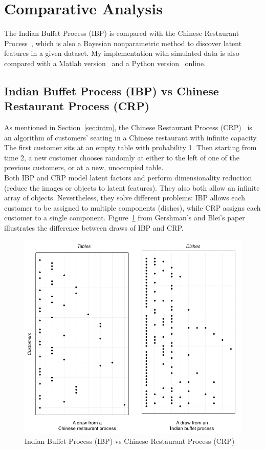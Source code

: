 \section{Comparative Analysis}

The Indian Buffet Process (IBP) is compared with the Chinese Restaurant Process~\cite{crp2004hierarchical}, which is also a Bayesian nonparametric method to discover latent features in a given dataset. My implementation with simulated data is also compared with a Matlab version~\cite{ibp2012code} and a Python version~\cite{ibpgithub} online.

\subsection{Indian Buffet Process (IBP) vs Chinese Restaurant Process (CRP)}

As mentioned in Section~\ref{sec:intro}, the Chinese Restaurant Process (CRP)~\cite{crp2004hierarchical} is an algorithm of customers' seating in a Chinese restaurant with infinite capacity. The first customer sits at an empty table with probability 1. Then starting from time 2, a new customer chooses randomly at either to the left of one of the previous customers, or at a new, unoccupied table.\\

Both IBP and CRP model latent factors and perform dimensionality reduction (reduce the images or objects to latent features). They also both allow an infinite array of objects. Nevertheless, they solve different problems: IBP allows each customer to be assigned to multiple components (dishes), while CRP assigns each customer to a single component. Figure~\ref{fig:CRP} from Gershman's and Blei's paper~\cite{gershman2012tutorial} illustrates the difference between draws of IBP and CRP.

\begin{figure}[!ht]
\centering
    \includegraphics[width=0.65\linewidth]{More_Images/IBP_vs_CRP.png}
    \caption{Indian Buffet Process (IBP) vs Chinese Restaurant Process (CRP)~\cite{gershman2012tutorial}}
    \label{fig:CRP}
\end{figure}

